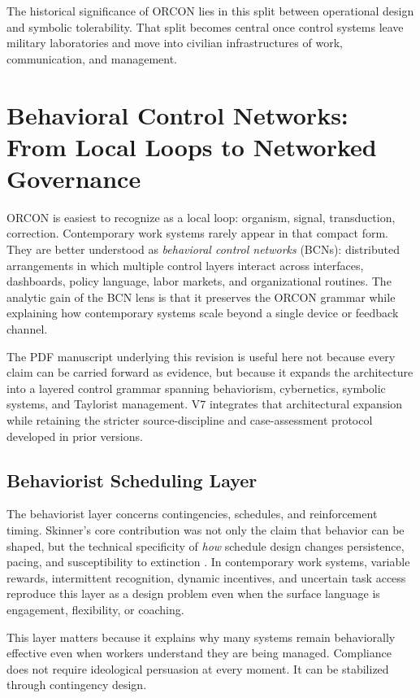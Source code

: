 \documentclass[runningheads]{llncs}
\begin{document}
The historical significance of ORCON lies in this split between operational design and symbolic tolerability. That split becomes central once control systems leave military laboratories and move into civilian infrastructures of work, communication, and management.

\section{Behavioral Control Networks: From Local Loops to Networked Governance}

ORCON is easiest to recognize as a local loop: organism, signal, transduction, correction. Contemporary work systems rarely appear in that compact form. They are better understood as \emph{behavioral control networks} (BCNs): distributed arrangements in which multiple control layers interact across interfaces, dashboards, policy language, labor markets, and organizational routines. The analytic gain of the BCN lens is that it preserves the ORCON grammar while explaining how contemporary systems scale beyond a single device or feedback channel.

The PDF manuscript underlying this revision is useful here not because every claim can be carried forward as evidence, but because it expands the architecture into a layered control grammar spanning behaviorism, cybernetics, symbolic systems, and Taylorist management. V7 integrates that architectural expansion while retaining the stricter source-discipline and case-assessment protocol developed in prior versions.

\subsection{Behaviorist Scheduling Layer}

The behaviorist layer concerns contingencies, schedules, and reinforcement timing. Skinner's core contribution was not only the claim that behavior can be shaped, but the technical specificity of \emph{how} schedule design changes persistence, pacing, and susceptibility to extinction \cite{skinner1953science}. In contemporary work systems, variable rewards, intermittent recognition, dynamic incentives, and uncertain task access reproduce this layer as a design problem even when the surface language is engagement, flexibility, or coaching.

This layer matters because it explains why many systems remain behaviorally effective even when workers understand they are being managed. Compliance does not require ideological persuasion at every moment. It can be stabilized through contingency design.
\end{document}
